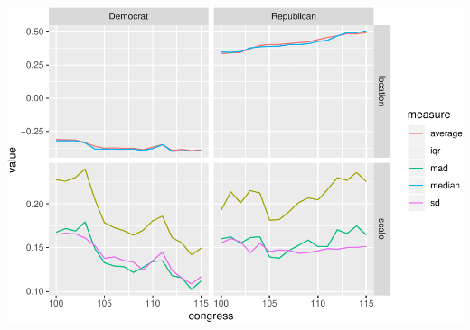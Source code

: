 \documentclass[]{book}
\begin{document}
\includegraphics{concepts-and-computation_files/figure-latex/unnamed-chunk-13-1.pdf}


\end{document}
